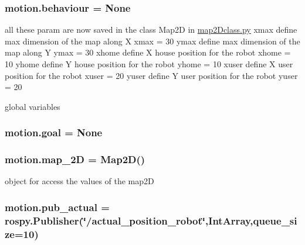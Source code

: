\subsubsection[{\texorpdfstring{behaviour}{behaviour}}]{\setlength{\rightskip}{0pt plus 5cm}motion.\+behaviour = None}\hypertarget{namespacemotion_a15d63b2a70ac940f179085ce72871c86}{}\label{namespacemotion_a15d63b2a70ac940f179085ce72871c86}


all these param are now saved in the class Map2D in \hyperlink{map2Dclass_8py}{map2\+Dclass.\+py} xmax define max dimension of the map along X xmax = 30 ymax define max dimension of the map along Y ymax = 30 xhome define X house position for the robot xhome = 10 yhome define Y house position for the robot yhome = 10 xuser define X user position for the robot xuser = 20 yuser define Y user position for the robot yuser = 20 

global variables 
\subsubsection[{\texorpdfstring{goal}{goal}}]{\setlength{\rightskip}{0pt plus 5cm}motion.\+goal = None}\hypertarget{namespacemotion_a6427953689c120f9b8a1cb3646733b85}{}\label{namespacemotion_a6427953689c120f9b8a1cb3646733b85}
\subsubsection[{\texorpdfstring{map\+\_\+2D}{map_2D}}]{\setlength{\rightskip}{0pt plus 5cm}motion.\+map\+\_\+2D = {\bf Map2D}()}\hypertarget{namespacemotion_a858c2a633daaa0a83b599397041f524b}{}\label{namespacemotion_a858c2a633daaa0a83b599397041f524b}


object for access the values of the map2D 

\subsubsection[{\texorpdfstring{pub\+\_\+actual}{pub_actual}}]{\setlength{\rightskip}{0pt plus 5cm}motion.\+pub\+\_\+actual = rospy.\+Publisher(\char`\"{}/actual\+\_\+position\+\_\+robot\char`\"{},Int\+Array,queue\+\_\+size=10)}\hypertarget{namespacemotion_a9213de80f34f408518c9265ee283b588}{}\label{namespacemotion_a9213de80f34f408518c9265ee283b588}


